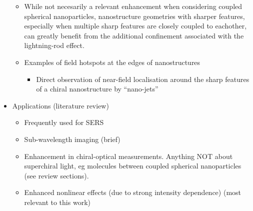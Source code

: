 \begin{itemize}
\begin{itemize}
        \item While not necesarily a relevant enhancement when considering coupled spherical nanoparticles, nanostructure geometries with sharper features, especially when multiple sharp features are closely coupled to eachother, can greatly benefit from the additional confinement associated with the lightning-rod effect.
        \item Examples of field hotspots at the edges of nanostructures
        \begin{itemize}
            \item Direct observation of near-field localisation around the sharp features of a chiral nanostructure by ``nano-jets''~\cite{Valev2012d}
        \end{itemize}
    \end{itemize}
    
    \item Applications (literature review)
    \begin{itemize}
        \item Frequently used for SERS
        \item Sub-wavelength imaging (brief)
        \item Enhancement in chiral-optical measurements. Anything NOT about superchiral light, eg molecules between coupled spherical nanoparticles (see review sections).
        \item Enhanced nonlinear effects (due to strong intensity dependence) (most relevant to this work)
    \end{itemize}
\end{itemize}

